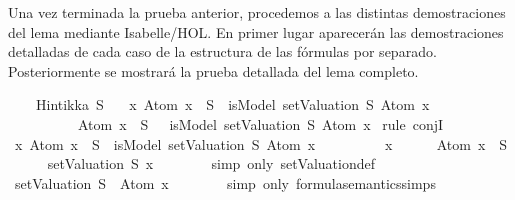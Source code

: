 \begin{isabellebody}
\begin{isamarkuptext}
  Una vez terminada la prueba anterior, procedemos a las distintas
  demostraciones del lema mediante Isabelle/HOL. En primer lugar
  aparecerán las demostraciones detalladas de cada caso de la estructura
  de las fórmulas por separado. Posteriormente se mostrará la prueba
  detallada del lema completo.%
\end{isamarkuptext}\isamarkuptrue%
\isamarkupfalse%
\isanewline
\ \ \ \ {\isachardoublequoteopen}Hintikka\ S{\isachardoublequoteclose}\isanewline
\ \ \ {\isachardoublequoteopen}{\isasymAnd}x{\isachardot}\ {\isacharparenleft}Atom\ x\ {\isasymin}\ S\ {\isasymlongrightarrow}\ isModel\ {\isacharparenleft}setValuation\ S{\isacharparenright}\ {\isacharparenleft}Atom\ x{\isacharparenright}{\isacharparenright}\ {\isasymand}\isanewline
\ \ \ \ \ \ \ \ \ {\isacharparenleft}\isactrlbold {\isasymnot}\ {\isacharparenleft}Atom\ x{\isacharparenright}\ {\isasymin}\ S\ {\isasymlongrightarrow}\ {\isasymnot}\ isModel\ {\isacharparenleft}setValuation\ S{\isacharparenright}\ {\isacharparenleft}Atom\ x{\isacharparenright}{\isacharparenright}{\isachardoublequoteclose}\isanewline
%
\isadelimproof
%
\endisadelimproof
%
\isatagproof
{}\isamarkupfalse%
\ {\isacharparenleft}rule\ conjI{\isacharparenright}\isanewline
\ \ \isamarkupfalse%
\ {\isachardoublequoteopen}{\isasymAnd}x{\isachardot}\ Atom\ x\ {\isasymin}\ S\ {\isasymlongrightarrow}\ isModel\ {\isacharparenleft}setValuation\ S{\isacharparenright}\ {\isacharparenleft}Atom\ x{\isacharparenright}{\isachardoublequoteclose}\ \isanewline
\ \ \isamarkupfalse%
\isanewline
\ \ \ \ \isamarkupfalse%
\ x\isanewline
\ \ \ \ \isamarkupfalse%
\ {\isachardoublequoteopen}Atom\ x\ {\isasymin}\ S{\isachardoublequoteclose}\isanewline
\ \ \ \ \isamarkupfalse%
\ {\isachardoublequoteopen}{\isacharparenleft}setValuation\ S{\isacharparenright}\ x{\isachardoublequoteclose}\isanewline
\ \ \ \ \ \ \isamarkupfalse%
\ {\isacharparenleft}simp\ only{\isacharcolon}\ setValuation{\isacharunderscore}def{\isacharparenright}\isanewline
\ \ \ \ \isamarkupfalse%
\ {\isachardoublequoteopen}setValuation\ S\ {\isasymTurnstile}\ Atom\ x{\isachardoublequoteclose}\isanewline
\ \ \ \ \ \ \isamarkupfalse%
\ {\isacharparenleft}simp\ only{\isacharcolon}\ formula{\isacharunderscore}semantics{\isachardot}simps{\isacharparenleft}{}{\isacharparenright}{\isacharparenright}\isanewline
\ \ \ \ \isamarkupfalse%

\end{isabellebody}
